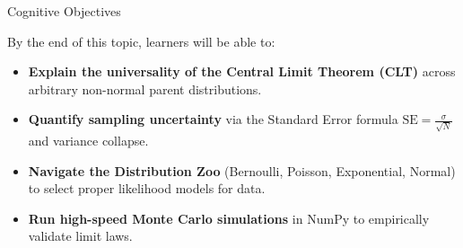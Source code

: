 \documentclass[../m00-session-03.tex]{subfiles}
\begin{document}

\begin{frame}{Cognitive Objectives}
  \begin{LearningObjectives}{By the end of this topic, learners will be able to:}
    \begin{itemize}\setlength{\itemsep}{0.28em}
      \item \textbf{Explain the universality of the Central Limit Theorem (CLT)} across arbitrary non-normal parent distributions.
      \item \textbf{Quantify sampling uncertainty} via the Standard Error formula $\text{SE} = \frac{\sigma}{\sqrt{N}}$ and variance collapse.
      \item \textbf{Navigate the Distribution Zoo} (Bernoulli, Poisson, Exponential, Normal) to select proper likelihood models for data.
      \item \textbf{Run high-speed Monte Carlo simulations} in NumPy to empirically validate limit laws.
    \end{itemize}
  \end{LearningObjectives}
\end{frame}
\end{document}
